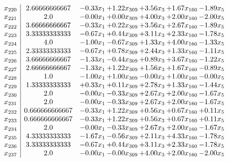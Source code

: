 \documentclass[8pt]{article}
\begin{document}
\[\begin{array}{c| c c@{\hskip 2pt} c@{\hskip 2pt} c@{\hskip 2pt} c@{\hskip 2pt} c@{\hskip 2pt} }
 x_{220}   &  2.66666666667 & -0.33 x_{1} & +  1.22 x_{309} & +  3.56 x_{3} & +  1.67 x_{160} & -1.89 x_{5}\\
 x_{221}   &  2.0 & -0.00 x_{1} & +  0.00 x_{309} & +  4.00 x_{3} & +  2.00 x_{160} & -2.00 x_{5}\\
 x_{222}   &  3.66666666667 & -0.33 x_{1} & +  0.22 x_{309} & +  3.56 x_{3} & +  2.67 x_{160} & -1.89 x_{5}\\
 x_{223}   &  3.33333333333 & -0.67 x_{1} & +  0.44 x_{309} & +  3.11 x_{3} & +  2.33 x_{160} & -1.78 x_{5}\\
 x_{224}   &  4.0 & -1.00 x_{1} & -0.67 x_{309} & +  1.33 x_{3} & +  4.00 x_{160} & -1.33 x_{5}\\
 x_{225}   &  2.33333333333 & -0.67 x_{1} & +  0.78 x_{309} & +  2.44 x_{3} & +  1.33 x_{160} & -1.11 x_{5}\\
 x_{226}   &  3.66666666667 & -1.33 x_{1} & -0.44 x_{309} & +  0.89 x_{3} & +  3.67 x_{160} & -1.22 x_{5}\\
 x_{227}   &  2.66666666667 & -1.33 x_{1} & +  1.22 x_{309} & +  1.56 x_{3} & +  1.67 x_{160} & -0.89 x_{5}\\
 x_{228}   &  1.0 & -1.00 x_{1} & +  1.00 x_{309} & -0.00 x_{3} & +  1.00 x_{160} & -0.00 x_{5}\\
 x_{229}   &  1.33333333333 & +  0.33 x_{1} & +  0.11 x_{309} & +  2.78 x_{3} & +  1.33 x_{160} & -1.44 x_{5}\\
 x_{230}   &  2.0 & -0.00 x_{1} & -0.33 x_{309} & +  2.67 x_{3} & +  2.00 x_{160} & -1.67 x_{5}\\
 x_{231}   &  2.0 & -0.00 x_{1} & -0.33 x_{309} & +  2.67 x_{3} & +  2.00 x_{160} & -1.67 x_{5}\\
 x_{232}   &  0.666666666667 & -0.33 x_{1} & +  1.22 x_{309} & +  0.56 x_{3} & +  0.67 x_{160} & +  0.11 x_{5}\\
 x_{233}   &  0.666666666667 & -0.33 x_{1} & +  1.22 x_{309} & +  0.56 x_{3} & +  0.67 x_{160} & +  0.11 x_{5}\\
 x_{234}   &  2.0 & -0.00 x_{1} & -0.33 x_{309} & +  2.67 x_{3} & +  2.00 x_{160} & -1.67 x_{5}\\
 x_{235}   &  4.33333333333 & -1.67 x_{1} & -0.56 x_{309} & +  2.11 x_{3} & +  4.33 x_{160} & -1.78 x_{5}\\
 x_{236}   &  3.33333333333 & -0.67 x_{1} & +  0.44 x_{309} & +  3.11 x_{3} & +  2.33 x_{160} & -1.78 x_{5}\\
 x_{237}   &  2.0 & -0.00 x_{1} & -0.00 x_{309} & +  4.00 x_{3} & +  2.00 x_{160} & -2.00 x_{5}\\

\end{array}\]
\end{document}
